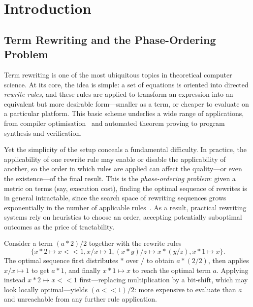 \chapter{Introduction}\label{chapter:introduction}

\section*{Term Rewriting and the Phase-Ordering Problem}

Term rewriting is one of the most ubiquitous topics in theoretical computer science.
At its core, the idea is simple: a set of equations is oriented into directed \emph{rewrite rules}, and these rules are applied to transform an expression into an equivalent but more desirable form---smaller as a term, or cheaper to evaluate on a particular platform.
This basic scheme underlies a wide range of applications, from compiler optimisation~\cite{lattnerLLVMCompilationFramework2004,merrillGenericGimpleNew2003} and automated theorem proving to program synthesis and verification.

Yet the simplicity of the setup conceals a fundamental difficulty.
In practice, the applicability of one rewrite rule may enable or disable the applicability of another, so the order in which rules are applied can affect the quality---or even the existence---of the final result.
This is the \emph{phase-ordering problem}: given a metric on terms (say, execution cost), finding the optimal sequence of rewrites is in general intractable, since the search space of rewriting sequences grows exponentially in the number of applicable rules~\cite{EqualitySaturation2009}.
As a result, practical rewriting systems rely on heuristics to choose an order, accepting potentially suboptimal outcomes as the price of tractability.

\begin{example}
\label{example:term_rewrite}
Consider a term $(a * 2) / 2$ together with the rewrite rules 
\[
\{x * 2 \mapsto x <\!\!< 1, x / x \mapsto 1, (x * y) / z \mapsto x * (y / z), x * 1 \mapsto x\}.
\]
The optimal sequence first distributes $*$ over $/$ to obtain $a * (2/2)$, then applies $x / x \mapsto 1$ to get $a * 1$, and finally $x * 1 \mapsto x$ to reach the optimal term $a$.
Applying instead $x * 2 \mapsto x <\!\!< 1$ first---replacing multiplication by a bit-shift, which may look locally optimal---yields $(a <\!\!< 1) / 2$: more expensive to evaluate than $a$ and unreachable from any further rule application.
\end{example}

